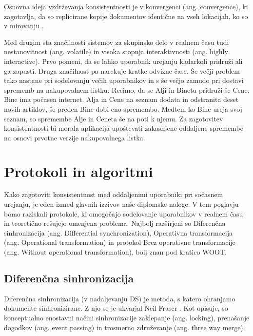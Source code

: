 \documentclass[a4paper, 12pt, twoside]{book}
\begin{document}
Osnovna ideja vzdrževanja konsistentnosti je v konvergenci (ang. convergence), ki zagotavlja, da so replicirane kopije dokumentov identične na vseh lokacijah, ko so v mirovanju \cite{wiki}.

Med drugim sta značilnosti sistemov za skupinsko delo v realnem času \cite{ccigs} tudi nestanovitnost (ang. volatile) in visoka stopnja interaktivnosti (ang. highly interactive). Prvo pomeni, da se lahko uporabnik urejanju kadarkoli pridruži ali ga zapusti. Druga značilnost pa narekuje kratke odvizne čase. Še večji problem tako nastane pri sodelovanju večih uporabnikov in s še večjo zamudo pri dostavi sprememb na nakupovalnem listku. Recimo, da se Alji in Binetu pridruži še Cene. Bine ima počasen internet. Alja in Cene na seznam dodata in odstranita deset novih artiklov, še preden Bine dobi eno spremembo. Medtem ko Bine ureja svoj seznam, so spremembe Alje in Ceneta še na poti k njemu. Za zagotovitev konsistentnosti bi morala aplikacija upoštevati zakasnjene oddaljene spremembe na osnovi prvotne verzije nakupovalnega listka.

\chapter{Protokoli in algoritmi}
\label{chp:protalg}

Kako zagotoviti konsistentnost med oddaljenimi uporabniki pri sočasnem urejanju, je eden izmed glavnih izzivov naše diplomske naloge. V tem poglavju bomo raziskali protokole, ki omogočajo sodelovanje uporabnikov v realnem času in teoretično rešujejo omenjena problema. Najbolj razširjeni so Diferenčna sinhronizacija (ang. Differential synchronization), Operativna transformacija (ang. Operational transformation) in protokol Brez operativne transformacije (ang. Without operational transformation), bolj znan pod kratico WOOT.

\section{Diferenčna sinhronizacija}
\label{sec:ds}

Diferenčna sinhronizacija (v nadaljevanju DS) je metoda, s katero ohranjamo dokumente sinhronizirane. Z njo se je ukvarjal Neil Fraser \cite{diffsync}. Kot opisuje, so konceptualno enostavni načini sinhronizacije zaklepanje (ang. locking), prenašanje dogodkov (ang. event passing) in trosmerno združevanje (ang. three way merge).
\end{document}
